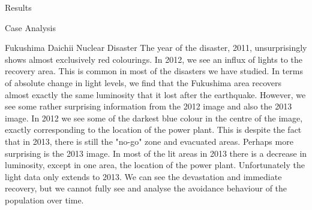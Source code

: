 \documentclass[12.5pt,fleqn,leqno,letterpaper]{article}
\begin{document}
\begin{section}{Results}
\begin{subsection}{Case Analysis}
\begin{subsubsection}{Fukushima Daichii Nuclear Disaster}
      The year of the disaster, 2011, unsurprisingly shows almost exclusively red colourings. In 2012, we see an influx of lights to the recovery area. This is common in most of the disasters we have studied. In terms of absolute change in light levels, we find that the Fukushima area recovers almost exactly the same luminosity that it lost after the earthquake. However, we see some rather surprising information from the 2012 image and also the 2013 image. In 2012 we see some of the darkest blue colour in the centre of the image, exactly corresponding to the location of the power plant. This is despite the fact that in 2013, there is still the "no-go" zone and evacuated areas. Perhaps more surprising is the 2013 image. In most of the lit areas in 2013 there is a decrease in luminosity, except in one area, the location of the power plant.  
      Unfortunately the light data only extends to 2013. We can see the devastation and immediate recovery, but we cannot fully see and analyse the avoidance behaviour of the population over time.  
    \end{subsubsection}

  \end{subsection}


\end{section}
\end{document}
